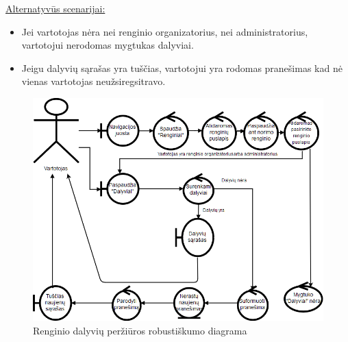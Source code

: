 \documentclass{VUMIFPSkursinis}
\begin{document}
\begin{enumerate} [label = \textbf{U\arabic*.}]
					\underline{Alternatyvūs scenarijai:}
					\begin{itemize}
						\item Jei vartotojas nėra nei renginio organizatorius, nei administratorius, vartotojui nerodomas mygtukas dalyviai.
						\item Jeigu dalyvių sąrašas yra tuščias, vartotojui yra rodomas pranešimas kad nė vienas vartotojas neužsiregsitravo.
					\end{itemize}

					\begin{figure}[H]
						\centering
						\includegraphics[width=\textwidth]{img/PSI5/u33.png}
						\caption{Renginio dalyvių peržiūros robustiškumo diagrama}
						\label{draw:u33}
					\end{figure}
		

\end{enumerate}
\end{document}
